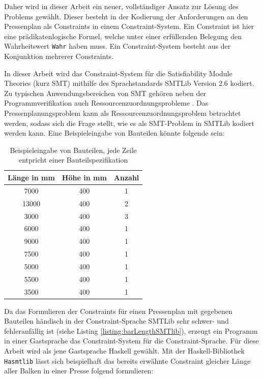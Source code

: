 Daher wird in dieser Arbeit ein neuer, vollständiger Ansatz zur Lösung des Problems gewählt.
Dieser besteht in der Kodierung der Anforderungen an den Pressenplan als Constraints in einem Constraint-System.
Ein Constraint ist hier eine prädikatenlogische Formel, welche unter einer erfüllenden Belegung den Wahrheitswert \texttt{Wahr} haben muss.
Ein Constraint-System besteht aus der Konjunktion mehrerer Constraints.

In dieser Arbeit wird das Constraint-System für die Satisfiability Module Theories (kurz SMT) mithilfe des Sprachstandards SMTLib Version 2.6 \cite{smtlib} kodiert.
Zu typischen Anwendungsbereichen von SMT gehören neben der Programmverifikation \cite{smt} auch Ressourcenzuordnungsprobleme \cite{rcpsp,smartnocs}.
Das Pressenplanungsproblem kann als Ressourcenzuordnungsproblem betrachtet werden, sodass sich die Frage stellt, wie es als SMT-Problem in SMTLib kodiert werden kann.
Eine Beispieleingabe von Bauteilen könnte folgende sein:

\begin{table}[H]
    \centering
    \begin{tabular}{|c|c|c|}
        \hline
        \textbf{Länge in mm} & \textbf{Höhe in mm} & \textbf{Anzahl} \\
        \hline
        7000 & 400 & 1 \\
        13000 & 400 & 2 \\
        3000 & 400 & 3 \\
        6000 & 400 & 1 \\
        9000 & 400 & 1 \\
        7500 & 400 & 1 \\
        5000 & 400 & 1 \\
        5500 & 400 & 1 \\
        3500 & 400 & 1 \\
        \hline
    \end{tabular}
    \caption{Beispieleingabe von Bauteilen, jede Zeile entpricht einer Bauteilspezifikation}
    \label{table:bauteileingabe}
\end{table}

Da das Formulieren der Constraints für einen Pressenplan mit gegebenen Bauteilen händisch in der Constraint-Sprache SMTLib sehr schwer- und fehleranfällig ist
(siehe Listing \ref{listing:barLengthSMTlib}), erzeugt ein Programm in einer Gastsprache das Constraint-System für die Constraint-Sprache.
Für diese Arbeit wird als jene Gastsprache Haskell \cite{haskellhistory} gewählt.
Mit der Haskell-Bibliothek \texttt{Hasmtlib} \cite{hasmtlib} lässt sich beispielhaft das bereits erwähnte Constraint
gleicher Länge aller Balken in einer Presse folgend formulieren:

